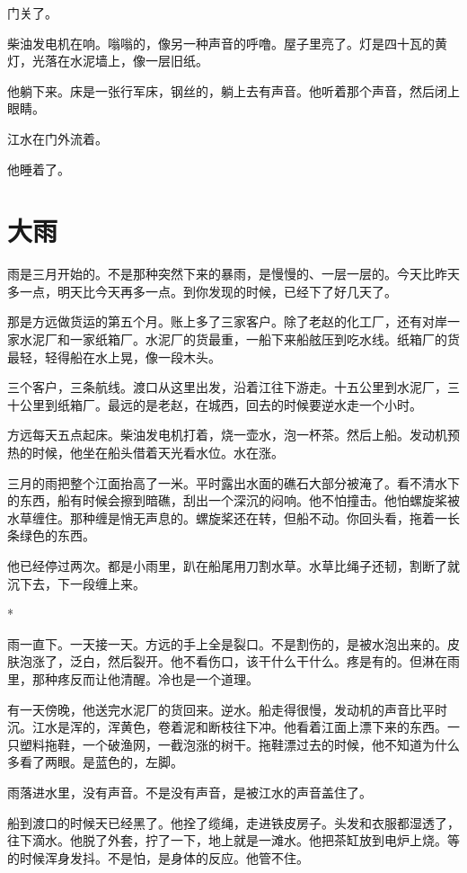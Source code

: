 \documentclass[UTF8,a5paper,11pt,openany]{ctexbook}
\newcommand{\scene}{\vspace{1em}\begin{center}*\quad*\quad*\end{center}\vspace{0.5em}}
\begin{document}
门关了。

柴油发电机在响。嗡嗡的，像另一种声音的呼噜。屋子里亮了。灯是四十瓦的黄灯，光落在水泥墙上，像一层旧纸。

他躺下来。床是一张行军床，钢丝的，躺上去有声音。他听着那个声音，然后闭上眼睛。

江水在门外流着。

他睡着了。

\clearpage

\chapter{大雨}
\indent
雨是三月开始的。不是那种突然下来的暴雨，是慢慢的、一层一层的。今天比昨天多一点，明天比今天再多一点。到你发现的时候，已经下了好几天了。

那是方远做货运的第五个月。账上多了三家客户。除了老赵的化工厂，还有对岸一家水泥厂和一家纸箱厂。水泥厂的货最重，一船下来船舷压到吃水线。纸箱厂的货最轻，轻得船在水上晃，像一段木头。

三个客户，三条航线。渡口从这里出发，沿着江往下游走。十五公里到水泥厂，三十公里到纸箱厂。最远的是老赵，在城西，回去的时候要逆水走一个小时。

方远每天五点起床。柴油发电机打着，烧一壶水，泡一杯茶。然后上船。发动机预热的时候，他坐在船头借着天光看水位。水在涨。

三月的雨把整个江面抬高了一米。平时露出水面的礁石大部分被淹了。看不清水下的东西，船有时候会擦到暗礁，刮出一个深沉的闷响。他不怕撞击。他怕螺旋桨被水草缠住。那种缠是悄无声息的。螺旋桨还在转，但船不动。你回头看，拖着一长条绿色的东西。

他已经停过两次。都是小雨里，趴在船尾用刀割水草。水草比绳子还韧，割断了就沉下去，下一段缠上来。


\scene

雨一直下。一天接一天。方远的手上全是裂口。不是割伤的，是被水泡出来的。皮肤泡涨了，泛白，然后裂开。他不看伤口，该干什么干什么。疼是有的。但淋在雨里，那种疼反而让他清醒。冷也是一个道理。

有一天傍晚，他送完水泥厂的货回来。逆水。船走得很慢，发动机的声音比平时沉。江水是浑的，浑黄色，卷着泥和断枝往下冲。他看着江面上漂下来的东西。一只塑料拖鞋，一个破渔网，一截泡涨的树干。拖鞋漂过去的时候，他不知道为什么多看了两眼。是蓝色的，左脚。

雨落进水里，没有声音。不是没有声音，是被江水的声音盖住了。

船到渡口的时候天已经黑了。他拴了缆绳，走进铁皮房子。头发和衣服都湿透了，往下滴水。他脱了外套，拧了一下，地上就是一滩水。他把茶缸放到电炉上烧。等的时候浑身发抖。不是怕，是身体的反应。他管不住。
\end{document}
